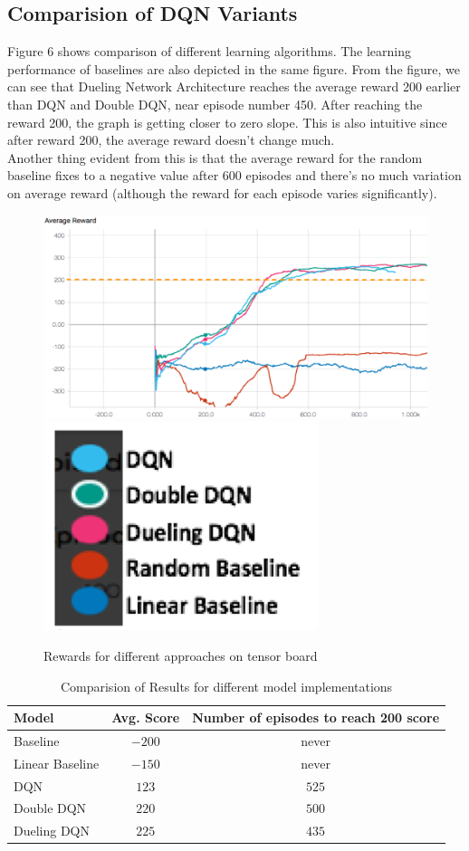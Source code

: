 \subsection{ Comparision of DQN Variants}

Figure 6 shows comparison of different learning algorithms. The learning performance of baselines are also depicted in the same figure. From the figure, we can see that Dueling Network Architecture reaches the average reward 200 earlier than DQN and Double DQN, near episode number 450. After reaching the reward 200, the graph is getting closer to zero slope. This is also intuitive since after reward 200, the average reward doesn’t change much. \\

Another thing evident from this is that the average reward for the random baseline fixes to a negative value after 600 episodes and there’s no much variation on average reward (although the reward for each episode varies significantly). 
 
\begin{figure}[!ht]
\centering
\includegraphics[scale=0.75,width=0.75\columnwidth]{figures/Picture1.png}%
\includegraphics[scale=0.15,width=0.15\columnwidth]{figures/Legend.png}%
\caption{ Rewards for different approaches on tensor board}%
\label{fig:Visualization}%
\end{figure}

\label{sec:exp}
\begin{table}%
\centering
\begin{tabular}{|l|c|c|}
\hline
Model & Avg. Score  & Number of episodes to reach 200 score  \\
\hline
Baseline & $-200$ & never \\
\hline
Linear Baseline & $-150$ & never \\
\hline
DQN & $123$ & $525$ \\
\hline
Double DQN & $220$ & $500$ \\
\hline
Dueling DQN & $225$ & $435$ \\
\hline
\end{tabular}
\caption{Comparision of Results for different model implementations}
\label{tab:Variants of DQN}
\end{table}


